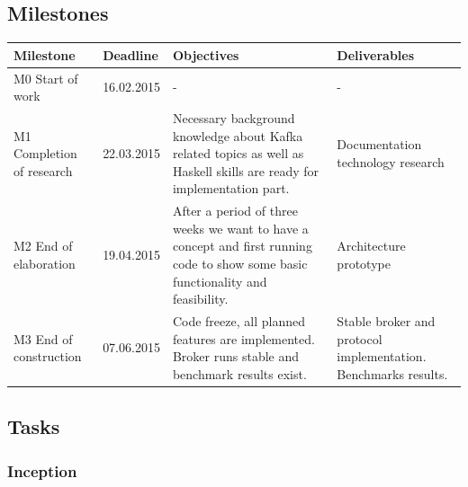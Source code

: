 \subsection{Milestones}
\begin{tabular}[H]{|p{4cm}|l|p{4.5cm}|p{4.5cm}|}\hline
    \textbf{Milestone} & \textbf{Deadline} & \textbf{Objectives} & \textbf{Deliverables} \\ \hline
    M0 Start of work & 16.02.2015 & - & -\\ \hline
    M1 Completion of research  & 22.03.2015 & 
        Necessary background knowledge about Kafka related topics as well as
        Haskell skills are ready for implementation part. 
        &
        Documentation technology research \\ \hline
    M2 End of elaboration & 19.04.2015 & 
        After a period of three weeks we want to have a concept and first running
        code to show some basic functionality and feasibility. 
        &
        Architecture prototype \\ \hline
    M3 End of construction & 07.06.2015 & 
        Code freeze, all planned features are implemented. Broker runs stable and
        benchmark results exist. 
        &
        Stable broker and protocol implementation. Benchmarks results. \\ \hline
\end{tabular}
\label{tab:MeilensteineZiele}

\newpage
\subsection{Tasks}
\label{subsec:tasks}
\subsubsection{Inception}


